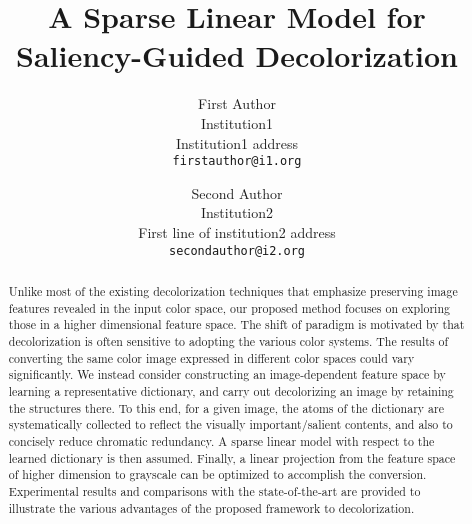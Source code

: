 \documentclass[10pt,twocolumn,letterpaper]{article}
\begin{document}
\title{A Sparse Linear Model for Saliency-Guided Decolorization}

\author{First Author\\
Institution1\\
Institution1 address\\
{\tt\small firstauthor@i1.org}
\and
Second Author\\
Institution2\\
First line of institution2 address\\
{\tt\small secondauthor@i2.org}
}

\maketitle

\begin{abstract}
   Unlike most of the existing decolorization techniques that emphasize
   preserving image features revealed in the input color space,
   our proposed method focuses on exploring those in a higher dimensional
   feature space. The shift of paradigm is motivated by that decolorization
   is often sensitive to adopting the various color systems. 
   The results of converting the same color image expressed in 
   different color spaces could vary significantly. We instead consider
   constructing an image-dependent feature space by learning a representative
   dictionary, and carry out decolorizing an image by retaining the structures
   there. To this end, for a given image, the atoms of the dictionary 
   are systematically collected to reflect the visually important/salient contents,
   and also to concisely reduce chromatic redundancy. 
   A sparse linear model with respect to the learned dictionary is then assumed.
   Finally, a linear projection from the feature space of higher dimension
   to grayscale can be optimized to accomplish the conversion.
   Experimental results and comparisons with the state-of-the-art are provided
   to illustrate the various advantages of the proposed framework to decolorization.
\end{abstract}







{\small


}
\end{document}
